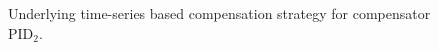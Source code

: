 \begin{figure}
\begin{tikzpicture}[node distance=2cm, shorten >= 1pt, >=stealth', auto, scale=0.9, transform shape]
\end{tikzpicture}
\caption{Underlying time-series based compensation strategy for compensator PID$_2$.}
\label{ch2:fig:power-transient-minimisation}
\end{figure}
